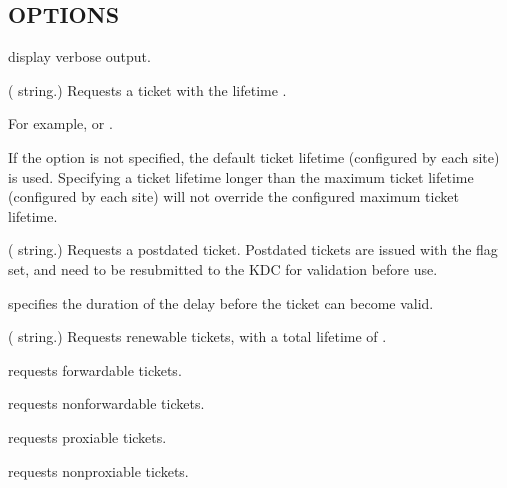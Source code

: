 \documentclass[letterpaper,10pt,english]{sphinxmanual}
\begin{document}
\subsection{OPTIONS}
\label{\detokenize{user/user_commands/kinit:options}}\begin{description}
\sphinxAtStartPar
display verbose output.

\sphinxAtStartPar
( string.)  Requests a ticket with the lifetime
.

\sphinxAtStartPar
For example,  or .

\sphinxAtStartPar
If the  option is not specified, the default ticket lifetime
(configured by each site) is used.  Specifying a ticket lifetime
longer than the maximum ticket lifetime (configured by each site)
will not override the configured maximum ticket lifetime.

\sphinxAtStartPar
( string.)  Requests a postdated ticket.  Postdated
tickets are issued with the  flag set, and need to be
resubmitted to the KDC for validation before use.

\sphinxAtStartPar
{} specifies the duration of the delay before the ticket
can become valid.

\sphinxAtStartPar
( string.)  Requests renewable tickets, with a total
lifetime of .

\sphinxAtStartPar
requests forwardable tickets.

\sphinxAtStartPar
requests non\sphinxhyphen{}forwardable tickets.

\sphinxAtStartPar
requests proxiable tickets.

\sphinxAtStartPar
requests non\sphinxhyphen{}proxiable tickets.


\end{description}
\end{document}
